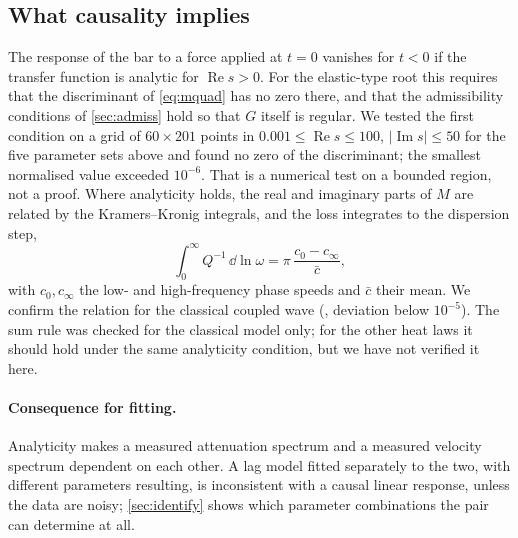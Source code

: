 \subsection{What causality implies}
The response of the bar to a force applied at $t=0$ vanishes for $t<0$ if the transfer function is analytic for $\operatorname{Re}s>0$. For the elastic-type root this requires that the discriminant of \eqref{eq:mquad} has no zero there, and that the admissibility conditions of \cref{sec:admiss} hold so that $G$ itself is regular. We tested the first condition on a grid of $60\times201$ points in $0.001\le\operatorname{Re}s\le100$, $|\operatorname{Im}s|\le50$ for the five parameter sets above and found no zero of the discriminant; the smallest normalised value exceeded $10^{-6}$. That is a numerical test on a bounded region, not a proof. Where analyticity holds, the real and imaginary parts of $M$ are related by the Kramers--Kronig integrals, and the loss integrates to the dispersion step,
\begin{equation}
\int_{0}^{\infty}Q^{-1}\,\dd\ln\omega=\pi\,\frac{c_{0}-c_{\infty}}{\bar c},
\end{equation}
with $c_0,c_\infty$ the low- and high-frequency phase speeds and $\bar c$ their mean. We confirm the relation for the classical coupled wave (, deviation below $10^{-5}$). The sum rule was checked for the classical model only; for the other heat laws it should hold under the same analyticity condition, but we have not verified it here.

\paragraph{Consequence for fitting.} Analyticity makes a measured attenuation spectrum and a measured velocity spectrum dependent on each other. A lag model fitted separately to the two, with different parameters resulting, is inconsistent with a causal linear response, unless the data are noisy; \cref{sec:identify} shows which parameter combinations the pair can determine at all.
